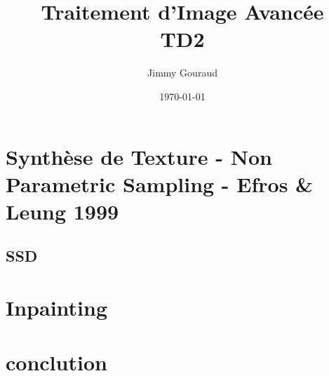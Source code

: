 \documentclass{article}
\begin{document}
\title{Traitement d'Image Avancée \\ TD2}
\author{Jimmy Gouraud}
\date{\today}
\maketitle

\section{Synthèse de Texture - Non Parametric Sampling - Efros \& Leung 1999}

\subsection{SSD}


\section{Inpainting}


\section{conclution}
\end{document}
